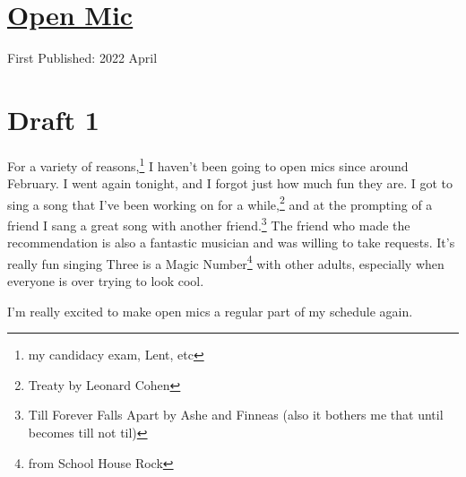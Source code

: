\documentclass[12pt]{article}[titlepage]
\newcommand{\1}{\={a}}
\newcommand{\2}{\={e}}
\newcommand{\3}{\={\i}}
\newcommand{\4}{\=o}
\newcommand{\5}{\=u}
\newcommand{\6}{\={A}}
\renewcommand{\,}{\textsuperscript{,}}
\begin{document}
\doublespacing
\section{\href{open-mic-5.html}{Open Mic}}
First Published: 2022 April

\section{Draft 1}
For a variety of reasons,\footnote{my candidacy exam, Lent, etc} I haven't been going to open mics since around February.
I went again tonight, and I forgot just how much fun they are.
I got to sing a song that I've been working on for a while,\footnote{Treaty by Leonard Cohen} and at the prompting of a friend I sang a great song with another friend.\footnote{Till Forever Falls Apart by Ashe and Finneas (also it bothers me that until becomes till not til)}
The friend who made the recommendation is also a fantastic musician and was willing to take requests.
It's really fun singing Three is a Magic Number\footnote{from School House Rock} with other adults, especially when everyone is over trying to look cool.

I'm really excited to make open mics a regular part of my schedule again.
\end{document}
